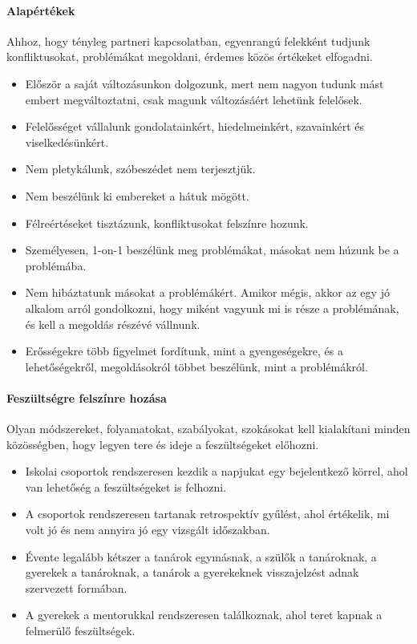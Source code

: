 \paragraph{Alapértékek}
Ahhoz, hogy tényleg partneri kapcsolatban, egyenrangú felekként tudjunk konfliktusokat, problémákat megoldani, érdemes közös értékeket elfogadni.
\begin{itemize}
      \item Először a saját változásunkon dolgozunk, mert nem nagyon tudunk mást embert megváltoztatni, csak magunk változásáért lehetünk felelősek.
      \item Felelősséget vállalunk gondolatainkért, hiedelmeinkért, szavainkért és viselkedésünkért.
      \item Nem pletykálunk, szóbeszédet nem terjesztjük.
      \item Nem beszélünk ki embereket a hátuk mögött.
      \item Félreértéseket tisztázunk, konfliktusokat felszínre hozunk.
      \item Személyesen, 1-on-1 beszélünk meg problémákat, másokat nem húzunk be a problémába.
      \item Nem hibáztatunk másokat a problémákért. Amikor mégis, akkor az egy jó alkalom arról gondolkozni, hogy miként vagyunk mi is része a problémának, és kell a megoldás részévé vállnunk.
      \item Erősségekre több figyelmet fordítunk, mint a gyengeségekre, és a lehetőségekről, megoldásokról többet beszélünk, mint a problémákról.
\end{itemize}

\paragraph{Feszültségre felszínre hozása}
Olyan módszereket, folyamatokat, szabályokat, szokásokat kell kialakítani minden közösségben, hogy legyen tere és ideje a feszültségeket előhozni.
\begin{itemize}
      \item Iskolai csoportok rendszeresen kezdik a napjukat egy bejelentkező körrel, ahol van lehetőség a feszültségeket is felhozni.
      \item A csoportok rendszeresen tartanak retrospektív gyűlést, ahol értékelik, mi volt jó és nem annyira jó egy vizsgált időszakban.
      \item Évente legalább kétszer a tanárok egymásnak, a szülők a tanároknak, a gyerekek a tanároknak, a tanárok a gyerekeknek visszajelzést adnak szervezett formában.
      \item A gyerekek a mentorukkal rendszeresen találkoznak, ahol teret kapnak a felmerülő feszültségek.
\end{itemize}

